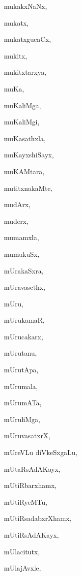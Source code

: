 \begin{multicols}{2}
{mukakxNaNx}, \pageref{mukakxNaNx}

{mukatx}, \pageref{mukatx}

{mukatxgucaCx}, \pageref{mukatxgucaCx}

{mukitx}, \pageref{mukitx}

{mukitxtarxya}, \pageref{mukitxtarxya}

{muKa}, \pageref{muKa}

{muKaliMga}, \pageref{muKaliMga}

{muKaliMgi}, \pageref{muKaliMgi}

{muKasathxla}, \pageref{muKasathxla}

{muKayxshiSayx}, \pageref{muKayxshiSayx}

{muKAMtara}, \pageref{muKAMtara}

{mutitxnakaMte}, \pageref{mutitxnakaMte}

{mudArx}, \pageref{mudArx}

{muderx}, \pageref{muderx}

{mumamxla}, \pageref{mumamxla}

{mumukuSx}, \pageref{mumukuSx}

{mUrakaSxra}, \pageref{mUrakaSxra}

{mUravasethx}, \pageref{mUravasethx}

{mUru}, \pageref{mUru}

{mUrukamaR}, \pageref{mUrukamaR}

{mUrucakarx}, \pageref{mUrucakarx}

{mUrutanu}, \pageref{mUrutanu}

{mUrutApa}, \pageref{mUrutApa}

{mUrumala}, \pageref{mUrumala}

{mUrumATa}, \pageref{mUrumATa}

{mUruliMga}, \pageref{mUruliMga}

{mUruvasatxrX}, \pageref{mUruvasatxrX}

{mUreVLu diVkeSx\-gaLu}, \pageref{mUreVLu diVkeSxgaLu}

{mUtaRsAdAKayx}, \pageref{mUtaRsAdAKayx}

{mUtiRbarxhamx}, \pageref{mUtiRbarxhamx}

{mUtiRyeMTu}, \pageref{mUtiRyeMTu}

{mUtiRsadabxrXhamx}, \pageref{mUtiRsadabxrXhamx}

{mUtiRsAdAKayx}, \pageref{mUtiRsAdAKayx}

{mUlacitutx}, \pageref{mUlacitutx}

{mUlajAvxle}, \pageref{mUlajAvxle}


\end{multicols}
